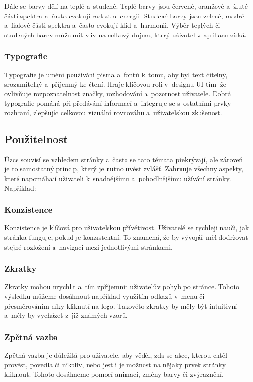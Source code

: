 Dále se barvy dělí na teplé a~studené. Teplé barvy jsou červené, oranžové a~žluté části spektra a~často evokují radost a~energii. Studené barvy jsou zelené, modré a~fialové části spektra a~často evokují klid a~harmonii. Výběr teplých či studených barev může mít vliv na celkový dojem, který uživatel z~aplikace získá. \cite{color_theory_design} 

\subsubsection{Typografie}
Typografie je umění používání písma a~fontů k~tomu, aby byl text čitelný, srozumitelný a~příjemný ke čtení. Hraje klíčovou roli v~designu UI tím, že ovlivňuje rozpoznatelnost značky, rozhodování a~pozornost uživatele. Dobrá typografie pomáhá při předávání informací a~integruje se s~ostatními prvky rozhraní, zlepšujíc celkovou vizuální rovnováhu a~uživatelskou zkušenost. \cite{typography}

\subsection{Použitelnost}
Úzce souvisí se vzhledem stránky a~často se tato témata překrývají, ale zároveň je to samostatný princip, který je nutno uvést zvlášť. Zahrnuje všechny aspekty, které napomáhají uživateli k~snadnějšímu a~pohodlnějšímu užívání stránky. Například: \cite{principles_of_ui_design}

\subsubsection*{Konzistence}
Konzistence je klíčová pro uživatelskou přívětivost. Uživatelé se rychleji naučí, jak stránka funguje, pokud je konzistentní. To znamená, že by vývojář měl dodržovat stejné rozložení a~navigaci mezi jednotlivými stránkami.

\subsubsection*{Zkratky}
Zkratky mohou urychlit a~tím zpříjemnit uživatelův pohyb po stránce. Tohoto výsledku můžeme dosáhnout například využitím odkazů v~menu či přesměrováním díky kliknutí na logo. Takovéto zkratky by měly být intuitivní a~měly by vycházet z~již známých vzorů.

\subsubsection*{Zpětná vazba}
Zpětná vazba je důležitá pro uživatele, aby věděl, zda se akce, kterou chtěl provést, povedla či nikoliv, nebo jestli je možnost na nějaký prvek stránky kliknout. Tohoto dosáhneme pomocí animací, změny barvy či zvýraznění.

